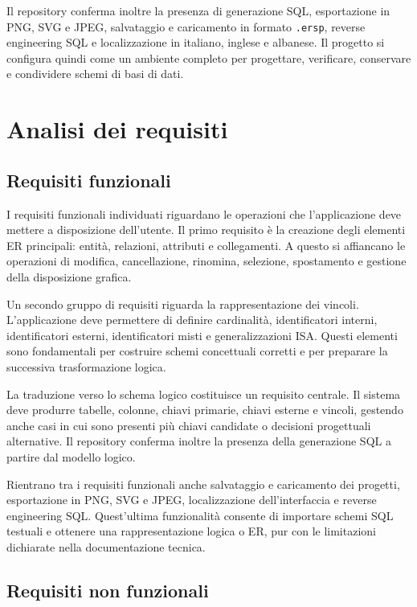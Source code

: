 \documentclass{unipd-thesis-modern}
\begin{document}
Il repository conferma inoltre la presenza di generazione SQL, esportazione in PNG, SVG e JPEG, salvataggio e caricamento in formato \texttt{.ersp}, reverse engineering SQL e localizzazione in italiano, inglese e albanese. Il progetto si configura quindi come un ambiente completo per progettare, verificare, conservare e condividere schemi di basi di dati.

\chapter{Analisi dei requisiti}

\section{Requisiti funzionali}

I requisiti funzionali individuati riguardano le operazioni che l'applicazione deve mettere a disposizione dell'utente. Il primo requisito è la creazione degli elementi ER principali: entità, relazioni, attributi e collegamenti. A questo si affiancano le operazioni di modifica, cancellazione, rinomina, selezione, spostamento e gestione della disposizione grafica.

Un secondo gruppo di requisiti riguarda la rappresentazione dei vincoli. L'applicazione deve permettere di definire cardinalità, identificatori interni, identificatori esterni, identificatori misti e generalizzazioni ISA. Questi elementi sono fondamentali per costruire schemi concettuali corretti e per preparare la successiva trasformazione logica.

La traduzione verso lo schema logico costituisce un requisito centrale. Il sistema deve produrre tabelle, colonne, chiavi primarie, chiavi esterne e vincoli, gestendo anche casi in cui sono presenti più chiavi candidate o decisioni progettuali alternative. Il repository conferma inoltre la presenza della generazione SQL a partire dal modello logico.

Rientrano tra i requisiti funzionali anche salvataggio e caricamento dei progetti, esportazione in PNG, SVG e JPEG, localizzazione dell'interfaccia e reverse engineering SQL. Quest'ultima funzionalità consente di importare schemi SQL testuali e ottenere una rappresentazione logica o ER, pur con le limitazioni dichiarate nella documentazione tecnica.

\section{Requisiti non funzionali}
\end{document}
